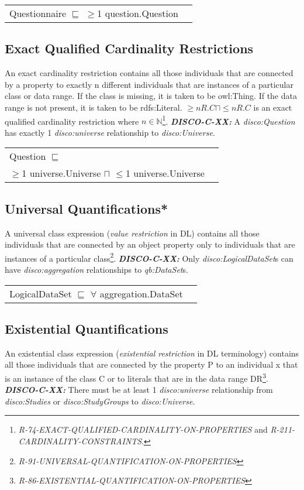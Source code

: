 \documentclass{elsart3p}    %
\newenvironment{DL}{
  \vspace{0cm}
  \begin{tabular}{l l}

}{
  \end{tabular}
}
\begin{document}
\begin{DL}
Questionnaire $\sqsubseteq$ $\geq$1 question.Question
\end{DL}

\subsection{Exact Qualified Cardinality Restrictions}

An exact cardinality restriction contains all those individuals that are connected by a property to exactly n different individuals that are instances of a particular class or data range. 
If the class is missing, it is taken to be owl:Thing. 
If the data range is not present, it is taken to be rdfs:Literal.
$\geq n R. C \sqcap \leq n R. C $ is an exact qualified cardinality restriction where $n \in \mathbb{N}$\footnote{{\em R-74-EXACT-QUALIFIED-CARDINALITY-ON-PROPERTIES} and {\em R-211-CARDINALITY-CONSTRAINTS}.}.
\textbf{{\em DISCO-C-XX:}}
A {\em disco:Question} has exactly 1 {\em disco:universe} relationship to {\em disco:Universe}.

\begin{DL}
Question $\sqsubseteq$ \\
$\geq$1 universe.Universe $\sqcap$ $\leq$1 universe.Universe \\
\end{DL}

\subsection{Universal Quantifications*}

A universal class expression ({\em value restriction} in DL) contains all those individuals that are connected by an object property only to individuals that are instances of a particular class\footnote{{\em R-91-UNIVERSAL-QUANTIFICATION-ON-PROPERTIES}}.
\textbf{{\em DISCO-C-XX:}}
Only {\em disco:LogicalDataSet}s can have {\em disco:aggregation} relationships to {\em qb:DataSet}s.

\begin{DL}
LogicalDataSet $\sqsubseteq$ $\forall$ aggregation.DataSet \\
\end{DL}

\subsection{Existential Quantifications}

An existential class expression ({\em existential restriction} in DL terminology) contains all those individuals that are connected by the property P to an individual x that is an instance of the class C or to literals that are in the data range DR\footnote{{\em R-86-EXISTENTIAL-QUANTIFICATION-ON-PROPERTIES}}.
\textbf{{\em DISCO-C-XX:}} 
There must be at least 1 {\em disco:universe} relationship from {\em disco:Studies} or {\em disco:StudyGroups} to {\em disco:Universe}.
\end{document}
